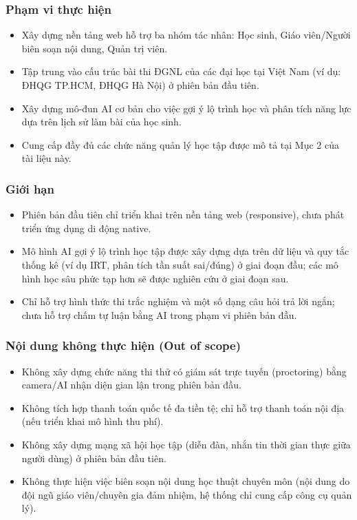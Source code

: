 \documentclass[12pt,a4paper]{article}
\begin{document}
	\subsubsection*{Phạm vi thực hiện}
	\begin{itemize}[nosep]
		\item Xây dựng nền tảng web hỗ trợ ba nhóm tác nhân: Học sinh, Giáo viên/Người biên soạn nội dung, Quản trị viên.
		\item Tập trung vào cấu trúc bài thi ĐGNL của các đại học tại Việt Nam (ví dụ: ĐHQG TP.HCM, ĐHQG Hà Nội) ở phiên bản đầu tiên.
		\item Xây dựng mô-đun AI cơ bản cho việc gợi ý lộ trình học và phân tích năng lực dựa trên lịch sử làm bài của học sinh.
		\item Cung cấp đầy đủ các chức năng quản lý học tập được mô tả tại Mục 2 của tài liệu này.
	\end{itemize}
	
	\subsubsection*{Giới hạn}
	\begin{itemize}[nosep]
		\item Phiên bản đầu tiên chỉ triển khai trên nền tảng web (responsive), chưa phát triển ứng dụng di động native.
		\item Mô hình AI gợi ý lộ trình học tập được xây dựng dựa trên dữ liệu và quy tắc thống kê (ví dụ IRT, phân tích tần suất sai/đúng) ở giai đoạn đầu; các mô hình học sâu phức tạp hơn sẽ được nghiên cứu ở giai đoạn sau.
		\item Chỉ hỗ trợ hình thức thi trắc nghiệm và một số dạng câu hỏi trả lời ngắn; chưa hỗ trợ chấm tự luận bằng AI trong phạm vi phiên bản đầu.
	\end{itemize}
	
	\subsubsection*{Nội dung không thực hiện (Out of scope)}
	\begin{itemize}[nosep]
		\item Không xây dựng chức năng thi thử có giám sát trực tuyến (proctoring) bằng camera/AI nhận diện gian lận trong phiên bản đầu.
		\item Không tích hợp thanh toán quốc tế đa tiền tệ; chỉ hỗ trợ thanh toán nội địa (nếu triển khai mô hình thu phí).
		\item Không xây dựng mạng xã hội học tập (diễn đàn, nhắn tin thời gian thực giữa người dùng) ở phiên bản đầu tiên.
		\item Không thực hiện việc biên soạn nội dung học thuật chuyên môn (nội dung do đội ngũ giáo viên/chuyên gia đảm nhiệm, hệ thống chỉ cung cấp công cụ quản lý).
	\end{itemize}
	
\end{document}
